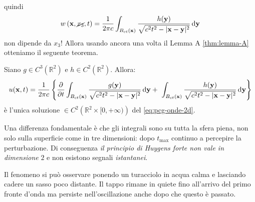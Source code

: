\FloatBarrier
quindi
\begin{equation*}
    w\left(\mathbf{x} ,\cancel{x_{3}} ,t\right) =\frac{1}{2\pi c}\int _{B_{ct}(\mathbf{x})}\frac{h(\mathbf{y})}{\sqrt{c^{2} t^{2} -| \mathbf{x} -\mathbf{y}| ^{2}}} \,\mathrm d \mathbf{y}
\end{equation*}
non dipende da $\displaystyle x_{3}$! Allora usando ancora una volta il Lemma A \vref{thm:lemma-A} otteniamo il seguente teorema.
\begin{theorem}
     Siano $\displaystyle g\in C^{3}\left(\mathbb{R}^{2}\right)$ e $\displaystyle h\in C^{2}\left(\mathbb{R}^{2}\right)$. Allora:
    \begin{equation}
        u(\x ,t) =\frac{1}{2\pi c}\left\{\frac{\partial }{\partial t}\int _{B_{ct}(\x)}\frac{g(\y)}{\sqrt{c^{2} t^{2} -| \x -\y| ^{2}}} \dyy +\ \int _{B_{ct}(\x)}\frac{h(\y)}{\sqrt{c^{2} t^{2} -| \x -\y| ^{2}}} \dyy\right\}
    \end{equation}
    è l'unica soluzione $\displaystyle \in C^{2}\left(\mathbb{R}^{2} \times [ 0,+\infty)\right)$ del \eqref{eq:pcg-onde-2d}.
\end{theorem}
Una differenza fondamentale è che gli integrali sono su tutta la sfera piena, non solo sulla superficie come in tre dimensioni: dopo $\displaystyle t_{\max}$ continuo a percepire la perturbazione. Di conseguenza \textit{il principio di Huygens forte non vale in dimensione }$2$ e non esistono segnali \textit{istantanei}.

Il fenomeno si può osservare ponendo un turacciolo in acqua calma e lasciando cadere un sasso poco distante. Il tappo rimane in quiete fino all'arrivo del primo fronte d'onda ma persiste nell'oscillazione anche dopo che questo è passato.